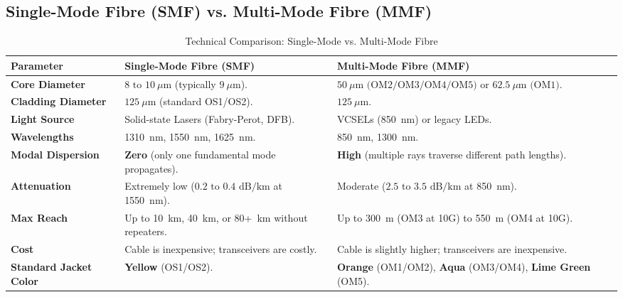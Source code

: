 \subsection{Single-Mode Fibre (SMF) vs. Multi-Mode Fibre (MMF)}
\begin{table}[H]
\centering
\small
{}
\begin{tabularx}{\linewidth}{l X X}
\toprule
\rowcolor{tableheadercolor}
\textbf{Parameter} & \textbf{Single-Mode Fibre (SMF)} & \textbf{Multi-Mode Fibre (MMF)} \\
\midrule
\textbf{Core Diameter} & $8\text{ to }10~\mu\text{m}$ (typically $9~\mu\text{m}$). & $50~\mu\text{m}\text{ (OM2/OM3/OM4/OM5) or }62.5~\mu\text{m}\text{ (OM1)}$. \\
\textbf{Cladding Diameter} & $125~\mu\text{m}$ (standard OS1/OS2). & $125~\mu\text{m}$. \\
\textbf{Light Source} & Solid-state Lasers (Fabry-Perot, DFB). & VCSELs (850~nm) or legacy LEDs. \\
\textbf{Wavelengths} & 1310~nm, 1550~nm, 1625~nm. & 850~nm, 1300~nm. \\
\textbf{Modal Dispersion} & \textbf{Zero} (only one fundamental mode propagates). & \textbf{High} (multiple rays traverse different path lengths). \\
\textbf{Attenuation} & Extremely low ($0.2\text{ to }0.4\text{ dB/km}$ at 1550~nm). & Moderate ($2.5\text{ to }3.5\text{ dB/km}$ at 850~nm). \\
\textbf{Max Reach} & Up to 10~km, 40~km, or 80+~km without repeaters. & Up to 300~m (OM3 at 10G) to 550~m (OM4 at 10G). \\
\textbf{Cost} & Cable is inexpensive; transceivers are costly. & Cable is slightly higher; transceivers are inexpensive. \\
\textbf{Standard Jacket Color} & \textbf{Yellow} (OS1/OS2). & \textbf{Orange} (OM1/OM2), \textbf{Aqua} (OM3/OM4), \textbf{Lime Green} (OM5). \\
\bottomrule
\end{tabularx}
\caption{Technical Comparison: Single-Mode vs. Multi-Mode Fibre}
\end{table}

